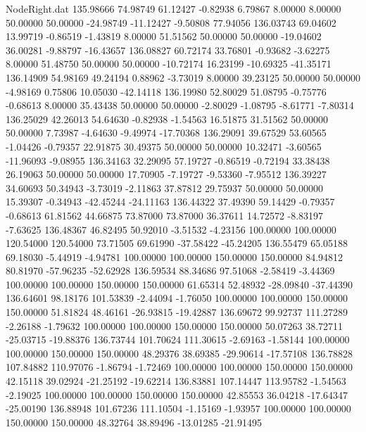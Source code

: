 \begin{filecontents}{NodeRight.dat}
 135.98666   74.98749   61.12427    -0.82938    6.79867    8.00000    8.00000   50.00000   50.00000  -24.98749  -11.12427   -9.50808   77.94056
 136.03743   69.04602   13.99719    -0.86519   -1.43819    8.00000   51.51562   50.00000   50.00000  -19.04602   36.00281   -9.88797  -16.43657
 136.08827   60.72174   33.76801    -0.93682   -3.62275    8.00000   51.48750   50.00000   50.00000  -10.72174   16.23199  -10.69325  -41.35171
 136.14909   54.98169   49.24194     0.88962   -3.73019    8.00000   39.23125   50.00000   50.00000   -4.98169    0.75806   10.05030  -42.14118
 136.19980   52.80029   51.08795    -0.75776   -0.68613    8.00000   35.43438   50.00000   50.00000   -2.80029   -1.08795   -8.61771   -7.80314
 136.25029   42.26013   54.64630    -0.82938   -1.54563   16.51875   31.51562   50.00000   50.00000    7.73987   -4.64630   -9.49974  -17.70368
 136.29091   39.67529   53.60565    -1.04426   -0.79357   22.91875   30.49375   50.00000   50.00000   10.32471   -3.60565  -11.96093   -9.08955
 136.34163   32.29095   57.19727    -0.86519   -0.72194   33.38438   26.19063   50.00000   50.00000   17.70905   -7.19727   -9.53360   -7.95512
 136.39227   34.60693   50.34943    -3.73019   -2.11863   37.87812   29.75937   50.00000   50.00000   15.39307   -0.34943  -42.45244  -24.11163
 136.44322   37.49390   59.14429    -0.79357   -0.68613   61.81562   44.66875   73.87000   73.87000   36.37611   14.72572   -8.83197   -7.63625
 136.48367   46.82495   50.92010    -3.51532   -4.23156  100.00000  100.00000  120.54000  120.54000   73.71505   69.61990  -37.58422  -45.24205
 136.55479   65.05188   69.18030    -5.44919   -4.94781  100.00000  100.00000  150.00000  150.00000   84.94812   80.81970  -57.96235  -52.62928
 136.59534   88.34686   97.51068    -2.58419   -3.44369  100.00000  100.00000  150.00000  150.00000   61.65314   52.48932  -28.09840  -37.44390
 136.64601   98.18176  101.53839    -2.44094   -1.76050  100.00000  100.00000  150.00000  150.00000   51.81824   48.46161  -26.93815  -19.42887
 136.69672   99.92737  111.27289    -2.26188   -1.79632  100.00000  100.00000  150.00000  150.00000   50.07263   38.72711  -25.03715  -19.88376
 136.73744  101.70624  111.30615    -2.69163   -1.58144  100.00000  100.00000  150.00000  150.00000   48.29376   38.69385  -29.90614  -17.57108
 136.78828  107.84882  110.97076    -1.86794   -1.72469  100.00000  100.00000  150.00000  150.00000   42.15118   39.02924  -21.25192  -19.62214
 136.83881  107.14447  113.95782    -1.54563   -2.19025  100.00000  100.00000  150.00000  150.00000   42.85553   36.04218  -17.64347  -25.00190
 136.88948  101.67236  111.10504    -1.15169   -1.93957  100.00000  100.00000  150.00000  150.00000   48.32764   38.89496  -13.01285  -21.91495

\end{filecontents}
